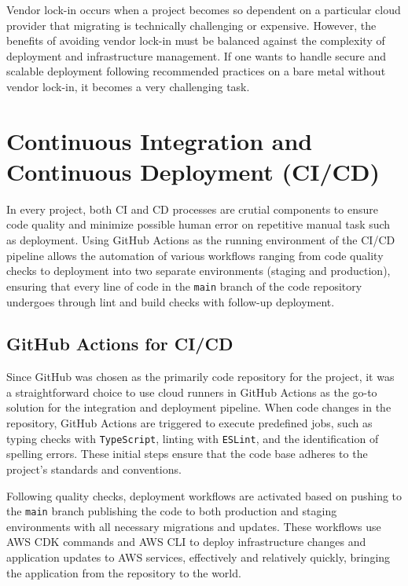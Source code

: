 Vendor lock-in occurs when a project becomes so dependent on a particular cloud provider that migrating is technically challenging or expensive.
However, the benefits of avoiding vendor lock-in must be balanced against the complexity of deployment and infrastructure management.
If one wants to handle secure and scalable deployment following recommended practices on a bare metal without vendor lock-in, it becomes a very challenging task.



\section{Continuous Integration and Continuous Deployment (CI/CD)}
\label{sec:cicd}
In every project, both \ac{CI} and \ac{CD} processes are crutial components to ensure code quality and minimize possible human error on repetitive manual task such as deployment.
Using GitHub Actions as the running environment of the \ac{CI}/\ac{CD} pipeline allows the automation of various workflows ranging from code quality checks to deployment into two separate environments (staging and production), ensuring that every line of code in the \texttt{main} branch of the code repository undergoes through lint and build checks with follow-up deployment.

\subsection{GitHub Actions for CI/CD}
\label{subsec:github-actions-cicd}

Since GitHub was chosen as the primarily code repository for the project, it was a straightforward choice to use cloud runners in GitHub Actions as the go-to solution for the integration and deployment pipeline.
When code changes in the repository, GitHub Actions are triggered to execute predefined jobs, such as typing checks with \texttt{TypeScript}, linting with \texttt{ESLint}, and the identification of spelling errors.
These initial steps ensure that the code base adheres to the project's standards and conventions.

Following quality checks, deployment workflows are activated based on pushing to the \texttt{main} branch publishing the code to both production and staging environments with all necessary migrations and updates.
These workflows use \ac{AWS CDK} commands and \ac{AWS CLI} to deploy infrastructure changes and application updates to \ac{AWS} services, effectively and relatively quickly, bringing the application from the repository to the world.


